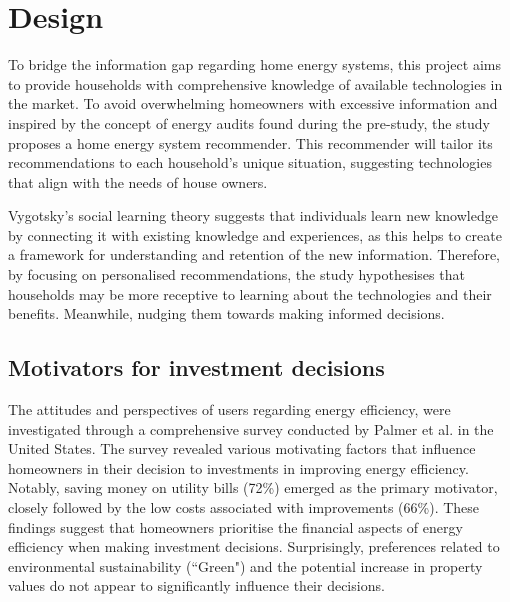 \chapter{Design} 

To bridge the information gap regarding home energy systems, this project aims to provide households with comprehensive knowledge of available technologies in the market. 
To avoid overwhelming homeowners with excessive information 
and inspired by the concept of energy audits found during the pre-study,
the study proposes a home energy system recommender. 
This recommender will tailor its recommendations to each household's unique situation, 
suggesting technologies that align with the needs of house owners. 

Vygotsky's social learning theory suggests that individuals learn new knowledge by connecting it with existing knowledge and experiences, as this helps to create a framework for understanding and retention of the new information.
Therefore, by focusing on personalised recommendations, the study hypothesises that households may be more receptive to learning about the technologies and their benefits. 
Meanwhile, nudging them towards making informed decisions. 


\section{Motivators for investment decisions}

The attitudes and perspectives of users regarding energy efficiency, were investigated through a comprehensive survey conducted by Palmer et al. \cite{informationgap} in the United States.
The survey revealed various motivating factors that influence homeowners in their decision to investments in improving energy efficiency. 
Notably, saving money on utility bills (72\%) emerged as the primary motivator, 
closely followed by the low costs associated with improvements (66\%). 
These findings suggest that homeowners prioritise the financial aspects of energy efficiency when making investment decisions. 
Surprisingly, preferences related to environmental sustainability (``Green") and the potential increase in property values do not appear to significantly influence their decisions.

